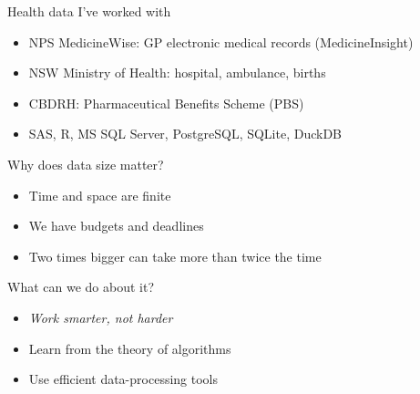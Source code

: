 \documentclass[aspectratio=169,12pt,usepdftitle=false]{beamer} %
\begin{document}
\begin{frame}{Health data I've worked with}
    \begin{itemize}
	\item NPS MedicineWise: GP electronic medical records (MedicineInsight)
	\item NSW Ministry of Health: hospital, ambulance, births
	\item CBDRH: Pharmaceutical Benefits Scheme (PBS)
	\item SAS, R, MS SQL Server, PostgreSQL, SQLite, DuckDB
    \end{itemize}
\end{frame}

\begin{frame}{Why does data size matter?}
    \begin{itemize}
        \item Time and space are finite
	\item We have budgets and deadlines
	\item Two times bigger can take more than twice the time
    \end{itemize}
\end{frame}


\begin{frame}{What can we do about it?}
    \begin{itemize}
	\item \emph{Work smarter, not harder}
	\item Learn from the theory of algorithms
	\item Use efficient data-processing tools
    \end{itemize}
\end{frame}

{
\begin{frame}[plain]
\end{frame}
}
\end{document}

